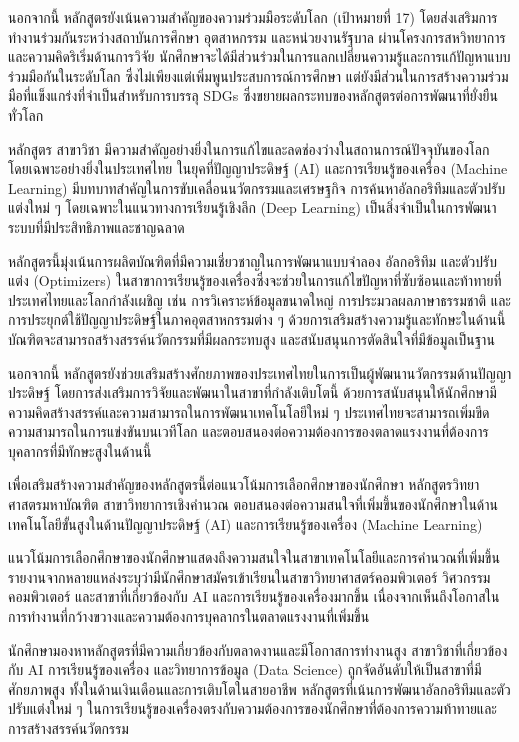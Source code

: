 นอกจากนี้ หลักสูตรยังเน้นความสำคัญของความร่วมมือระดับโลก (เป้าหมายที่ 17) โดยส่งเสริมการทำงานร่วมกันระหว่างสถาบันการศึกษา อุตสาหกรรม และหน่วยงานรัฐบาล ผ่านโครงการสหวิทยาการและความคิดริเริ่มด้านการวิจัย นักศึกษาจะได้มีส่วนร่วมในการแลกเปลี่ยนความรู้และการแก้ปัญหาแบบร่วมมือกันในระดับโลก ซึ่งไม่เพียงแต่เพิ่มพูนประสบการณ์การศึกษา แต่ยังมีส่วนในการสร้างความร่วมมือที่แข็งแกร่งที่จำเป็นสำหรับการบรรลุ SDGs ซึ่งขยายผลกระทบของหลักสูตรต่อการพัฒนาที่ยั่งยืนทั่วโลก

หลักสูตร\thdegree{} สาขาวิชา\thdegreebranch{} มีความสำคัญอย่างยิ่งในการแก้ไขและลดช่องว่างในสถานการณ์ปัจจุบันของโลก โดยเฉพาะอย่างยิ่งในประเทศไทย ในยุคที่ปัญญาประดิษฐ์ (AI) และการเรียนรู้ของเครื่อง (Machine Learning) มีบทบาทสำคัญในการขับเคลื่อนนวัตกรรมและเศรษฐกิจ การค้นหาอัลกอริทึมและตัวปรับแต่งใหม่ ๆ โดยเฉพาะในแนวทางการเรียนรู้เชิงลึก (Deep Learning) เป็นสิ่งจำเป็นในการพัฒนาระบบที่มีประสิทธิภาพและชาญฉลาด

หลักสูตรนี้มุ่งเน้นการผลิตบัณฑิตที่มีความเชี่ยวชาญในการพัฒนาแบบจำลอง อัลกอริทึม และตัวปรับแต่ง (Optimizers) ในสาขาการเรียนรู้ของเครื่องซึ่งจะช่วยในการแก้ไขปัญหาที่ซับซ้อนและท้าทายที่ประเทศไทยและโลกกำลังเผชิญ เช่น การวิเคราะห์ข้อมูลขนาดใหญ่ การประมวลผลภาษาธรรมชาติ และการประยุกต์ใช้ปัญญาประดิษฐ์ในภาคอุตสาหกรรมต่าง ๆ ด้วยการเสริมสร้างความรู้และทักษะในด้านนี้ บัณฑิตจะสามารถสร้างสรรค์นวัตกรรมที่มีผลกระทบสูง และสนับสนุนการตัดสินใจที่มีข้อมูลเป็นฐาน

นอกจากนี้ หลักสูตรยังช่วยเสริมสร้างศักยภาพของประเทศไทยในการเป็นผู้พัฒนานวัตกรรมด้านปัญญาประดิษฐ์ โดยการส่งเสริมการวิจัยและพัฒนาในสาขาที่กำลังเติบโตนี้ ด้วยการสนับสนุนให้นักศึกษามีความคิดสร้างสรรค์และความสามารถในการพัฒนาเทคโนโลยีใหม่ ๆ ประเทศไทยจะสามารถเพิ่มขีดความสามารถในการแข่งขันบนเวทีโลก และตอบสนองต่อความต้องการของตลาดแรงงานที่ต้องการบุคลากรที่มีทักษะสูงในด้านนี้

เพื่อเสริมสร้างความสำคัญของหลักสูตรนี้ต่อแนวโน้มการเลือกศึกษาของนักศึกษา หลักสูตรวิทยาศาสตรมหาบัณฑิต สาขาวิทยาการเชิงคำนวณ ตอบสนองต่อความสนใจที่เพิ่มขึ้นของนักศึกษาในด้านเทคโนโลยีขั้นสูงในด้านปัญญาประดิษฐ์ (AI) และการเรียนรู้ของเครื่อง (Machine Learning)

แนวโน้มการเลือกศึกษาของนักศึกษาแสดงถึงความสนใจในสาขาเทคโนโลยีและการคำนวณที่เพิ่มขึ้น รายงานจากหลายแหล่งระบุว่ามีนักศึกษาสมัครเข้าเรียนในสาขาวิทยาศาสตร์คอมพิวเตอร์ วิศวกรรมคอมพิวเตอร์ และสาขาที่เกี่ยวข้องกับ AI และการเรียนรู้ของเครื่องมากขึ้น เนื่องจากเห็นถึงโอกาสในการทำงานที่กว้างขวางและความต้องการบุคลากรในตลาดแรงงานที่เพิ่มขึ้น

นักศึกษามองหาหลักสูตรที่มีความเกี่ยวข้องกับตลาดงานและมีโอกาสการทำงานสูง สาขาวิชาที่เกี่ยวข้องกับ AI การเรียนรู้ของเครื่อง และวิทยาการข้อมูล (Data Science) ถูกจัดอันดับให้เป็นสาขาที่มีศักยภาพสูง ทั้งในด้านเงินเดือนและการเติบโตในสายอาชีพ หลักสูตรที่เน้นการพัฒนาอัลกอริทึมและตัวปรับแต่งใหม่ ๆ ในการเรียนรู้ของเครื่องตรงกับความต้องการของนักศึกษาที่ต้องการความท้าทายและการสร้างสรรค์นวัตกรรม


